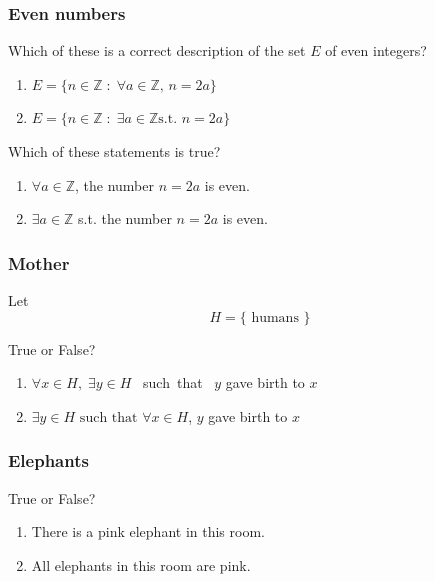 \documentclass[14pt]{beamer}
\begin{document}
\begin{frame}[t]
	\frametitle{Even numbers}

	Which of these is a correct description of the set $E$ of even integers?
	\begin{enumerate}
		\item $\displaystyle E = \{ n \in \mathbb{Z}\; : \; \forall a \in \mathbb{Z},
			\, n = 2a \}$

		\item $\displaystyle E = \{ n \in \mathbb{Z}\; : \; \exists a \in \mathbb{Z}\text{
			s.t. }n = 2a \}$
	\end{enumerate}

	\vfill

	Which of these statements is true?
	\begin{enumerate}
		\addtocounter{enumi}{2}

		\item $\displaystyle \forall a \in \mathbb{Z}$, the number
			$\displaystyle n=2a$ is even.

		\item $\displaystyle \exists a \in \mathbb{Z}$ s.t. the number
			$\displaystyle n=2a$ is even.
	\end{enumerate}

	\vfill
\end{frame}

\begin{frame}
	\frametitle{Mother}

	Let
	\[
		H = \{ \text{ humans }\}
	\]

	\vfill

	True or False?

	\begin{enumerate}
		\item $\displaystyle \forall x \in H, \; \exists y \in H$ \mbox{ such that }
			$y$ gave birth to $x$

		\item $\displaystyle \exists y \in H \text{ such that }\forall x \in H$, $y$
			gave birth to $x$
	\end{enumerate}

	\vfill
\end{frame}

\begin{frame}
	\frametitle{Elephants}

	True or False?

	\begin{enumerate}
		\item There is a pink elephant in this room.

		\item All elephants in this room are pink.
	\end{enumerate}
\end{frame}
\end{document}
